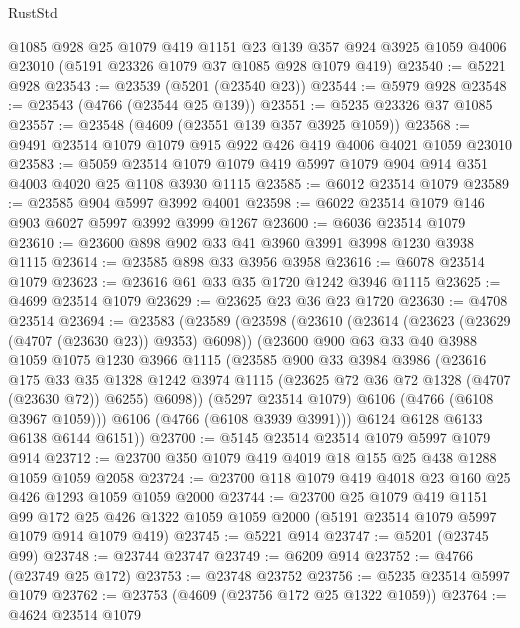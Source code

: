 \begin{lexlean}{RustStd}
\begin{coremodule}
{\begin{coremodule}
{{{{{{{{{{{{{{{{{{{{{{{{{{{{{{{{{{{    @1085
    @928
    @25
    @1079
    @419
    @1151
    @23
    @139
    @357
    @924
    @3925
    @1059
    @4006
    @23010
    (@5191 @23326 @1079 @37 @1085 @928 @1079 @419)
@23540 := @5221 @928
@23543 := @23539 (@5201 (@23540 @23))
@23544 := @5979 @928
@23548 := @23543 (@4766 (@23544 @25 @139))
@23551 := @5235 @23326 @37 @1085
@23557 := @23548 (@4609 (@23551 @139 @357 @3925 @1059))
@23568 := @9491 @23514 @1079 @1079 @915 @922 @426 @419 @4006 @4021 @1059 @23010
@23583 := @5059 @23514 @1079 @1079 @419 @5997 @1079 @904 @914 @351 @4003 @4020 @25 @1108 @3930 @1115
@23585 := @6012 @23514 @1079
@23589 := @23585 @904 @5997 @3992 @4001
@23598 := @6022 @23514 @1079 @146 @903 @6027 @5997 @3992 @3999 @1267
@23600 := @6036 @23514 @1079
@23610 := @23600 @898 @902 @33 @41 @3960 @3991 @3998 @1230 @3938 @1115
@23614 := @23585 @898 @33 @3956 @3958
@23616 := @6078 @23514 @1079
@23623 := @23616 @61 @33 @35 @1720 @1242 @3946 @1115
@23625 := @4699 @23514 @1079
@23629 := @23625 @23 @36 @23 @1720
@23630 := @4708 @23514
@23694 := @23583
    (@23589
      (@23598
        (@23610
          (@23614 (@23623 (@23629 (@4707 (@23630 @23)) @9353) @6098))
          (@23600
            @900
            @63
            @33
            @40
            @3988
            @1059
            @1075
            @1230
            @3966
            @1115
            (@23585
              @900
              @33
              @3984
              @3986
              (@23616
                @175
                @33
                @35
                @1328
                @1242
                @3974
                @1115
                (@23625 @72 @36 @72 @1328 (@4707 (@23630 @72)) @6255)
                @6098))
            (@5297 @23514 @1079)
            @6106
            (@4766 (@6108 @3967 @1059)))
          @6106
          (@4766 (@6108 @3939 @3991)))
        @6124
        @6128
        @6133
        @6138
        @6144
        @6151))
@23700 := @5145 @23514 @23514 @1079 @5997 @1079 @914
@23712 := @23700 @350 @1079 @419 @4019 @18 @155 @25 @438 @1288 @1059 @1059 @2058
@23724 := @23700 @118 @1079 @419 @4018 @23 @160 @25 @426 @1293 @1059 @1059 @2000
@23744 := @23700
    @25
    @1079
    @419
    @1151
    @99
    @172
    @25
    @426
    @1322
    @1059
    @1059
    @2000
    (@5191 @23514 @1079 @5997 @1079 @914 @1079 @419)
@23745 := @5221 @914
@23747 := @5201 (@23745 @99)
@23748 := @23744 @23747
@23749 := @6209 @914
@23752 := @4766 (@23749 @25 @172)
@23753 := @23748 @23752
@23756 := @5235 @23514 @5997 @1079
@23762 := @23753 (@4609 (@23756 @172 @25 @1322 @1059))
@23764 := @4624 @23514 @1079
}}}}}}}}}}}}}}}}}}}}}}}}}}}}}}}}}}}
\end{coremodule}}
\end{coremodule}
\end{lexlean}
